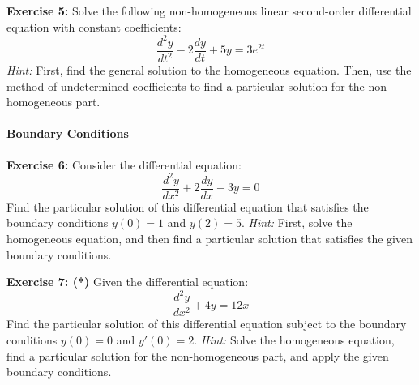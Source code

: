 \documentclass[]{article}
\begin{document}
	\textbf{Exercise 5:}
	Solve the following non-homogeneous linear second-order differential equation with constant coefficients:
	\[
	\frac{d^2y}{dt^2} - 2\frac{dy}{dt} + 5y = 3e^{2t}
	\]
	\textit{Hint:} First, find the general solution to the homogeneous equation. Then, use the method of undetermined coefficients to find a particular solution for the non-homogeneous part.
	
	\paragraph{Boundary Conditions}\mbox{}
	
	\textbf{Exercise 6:}
	Consider the differential equation:
	\[
	\frac{d^2y}{dx^2} + 2\frac{dy}{dx} - 3y = 0
	\]
	Find the particular solution of this differential equation that satisfies the boundary conditions \(y(0) = 1\) and \(y(2) = 5\).
	\textit{Hint:} First, solve the homogeneous equation, and then find a particular solution that satisfies the given boundary conditions.
	
	\textbf{Exercise 7: (*)}
	Given the differential equation:
	\[
	\frac{d^2y}{dx^2} + 4y = 12x
	\]
	Find the particular solution of this differential equation subject to the boundary conditions \(y(0) = 0\) and \(y'(0) = 2\).
	\textit{Hint:} Solve the homogeneous equation, find a particular solution for the non-homogeneous part, and apply the given boundary conditions.
	
	
	
\end{document}
